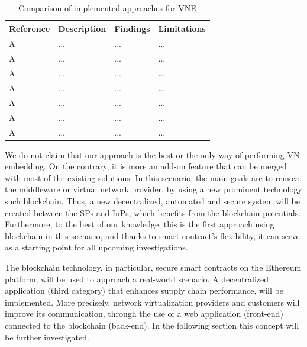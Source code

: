 \begin{table}[htbp]
	\myfloatalign \footnotesize
	\begin{tabularx}{\textwidth}{p{4cm}p{4cm}p{4cm}p{4cm}}
		\textbf{Reference} & \textbf{Description} & \textbf{Findings} & 		        \textbf{Limitations}  \\ 
		\hline
		A   &  ... &  ... &  ... \\ 
		A   &  ... &  ... &  ... \\ 
		A   &  ... &  ... &  ... \\ 
		A   &  ... &  ... &  ... \\ 
		A   &  ... &  ... &  ... \\ 
		A   &  ... &  ... &  ... \\ 							
		A   &  ... &  ... &  ... \\  
		\hline
	\end{tabularx}
	\caption{Comparison of implemented approaches for VNE}
	\label{tab:VNEComparison}
\end{table}


We do not claim that our approach is the best or the only way
of performing VN embedding. On the contrary, it is more an add-on feature that can be merged with most of the existing solutions. In this scenario, the main goals are to remove the middleware or virtual network provider, by using a new prominent technology such blockchain. Thus, a new decentralized, automated and secure system will be created between the SPs and InPs, which benefits from the blockchain potentials. Furthermore, to the best of our knowledge, this is the first approach using blockchain in this scenario, and thanks to smart contract's flexibility, it can serve as a starting point for all upcoming investigations.



The blockchain technology, in particular, secure smart contracts on the Ethereum platform, will be used to approach a real-world scenario. A decentralized application (third category) that enhances supply chain performance, will be implemented. More precisely, network virtualization providers and customers will improve its communication, through the use of a web application (front-end) connected to the blockchain (back-end). In the following section this concept will be further investigated.

